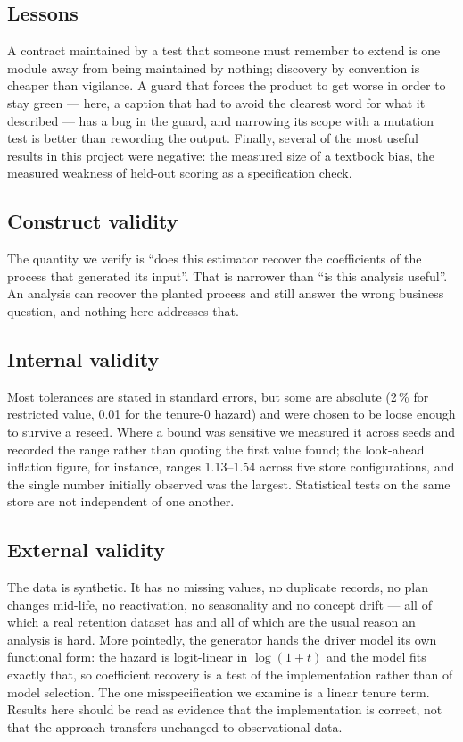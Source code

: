 \documentclass[conference]{IEEEtran}
\begin{document}
\subsection{Lessons}

A contract maintained by a test that someone must remember to extend is one
module away from being maintained by nothing; discovery by convention is
cheaper than vigilance. A guard that forces the product to get worse in order
to stay green --- here, a caption that had to avoid the clearest word for what
it described --- has a bug in the guard, and narrowing its scope with a mutation
test is better than rewording the output. Finally, several of the most useful
results in this project were negative: the measured size of a textbook bias,
the measured weakness of held-out scoring as a specification check.

\subsection{Construct validity}

The quantity we verify is ``does this estimator recover the coefficients of the
process that generated its input''. That is narrower than ``is this analysis
useful''. An analysis can recover the planted process and still answer the wrong
business question, and nothing here addresses that.

\subsection{Internal validity}

Most tolerances are stated in standard errors, but some are absolute (2\,\% for
restricted value, 0.01 for the tenure-0 hazard) and were chosen to be loose
enough to survive a reseed. Where a bound was sensitive we measured it across
seeds and recorded the range rather than quoting the first value found; the
look-ahead inflation figure, for instance, ranges 1.13--1.54 across five store
configurations, and the single number initially observed was the largest.
Statistical tests on the same store are not independent of one another.

\subsection{External validity}

The data is synthetic. It has no missing values, no duplicate records, no plan
changes mid-life, no reactivation, no seasonality and no concept drift --- all of
which a real retention dataset has and all of which are the usual reason an
analysis is hard. More pointedly, the generator hands the driver model its own
functional form: the hazard is logit-linear in $\log(1+t)$ and the model fits
exactly that, so coefficient recovery is a test of the implementation rather
than of model selection. The one misspecification we examine is a linear tenure
term. Results here should be read as evidence that the implementation is
correct, not that the approach transfers unchanged to observational data.
\end{document}
